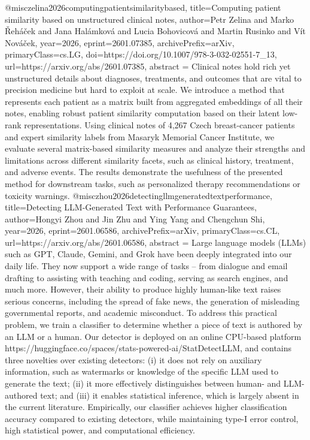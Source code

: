 {}@misc{zelina2026computingpatientsimilaritybased,
      title={Computing patient similarity based on unstructured clinical notes}, 
      author={Petr Zelina and Marko Řeháček and Jana Halámková and Lucia Bohovicová and Martin Rusinko and Vít Nováček},
      year={2026},
      eprint={2601.07385},
      archivePrefix={arXiv},
      primaryClass={cs.LG},
      doi={https://doi.org/10.1007/978-3-032-02551-7_13},
      url={https://arxiv.org/abs/2601.07385},
      abstract = {Clinical notes hold rich yet unstructured details about diagnoses, treatments, and outcomes that are vital to precision medicine but hard to exploit at scale. We introduce a method that represents each patient as a matrix built from aggregated embeddings of all their notes, enabling robust patient similarity computation based on their latent low-rank representations. Using clinical notes of 4,267 Czech breast-cancer patients and expert similarity labels from Masaryk Memorial Cancer Institute, we evaluate several matrix-based similarity measures and analyze their strengths and limitations across different similarity facets, such as clinical history, treatment, and adverse events. The results demonstrate the usefulness of the presented method for downstream tasks, such as personalized therapy recommendations or toxicity warnings.}
}@misc{zhou2026detectingllmgeneratedtextperformance,
      title={Detecting LLM-Generated Text with Performance Guarantees}, 
      author={Hongyi Zhou and Jin Zhu and Ying Yang and Chengchun Shi},
      year={2026},
      eprint={2601.06586},
      archivePrefix={arXiv},
      primaryClass={cs.CL},
      url={https://arxiv.org/abs/2601.06586},
      abstract = {Large language models (LLMs) such as GPT, Claude, Gemini, and Grok have been deeply integrated into our daily life. They now support a wide range of tasks -- from dialogue and email drafting to assisting with teaching and coding, serving as search engines, and much more. However, their ability to produce highly human-like text raises serious concerns, including the spread of fake news, the generation of misleading governmental reports, and academic misconduct. To address this practical problem, we train a classifier to determine whether a piece of text is authored by an LLM or a human. Our detector is deployed on an online CPU-based platform https://huggingface.co/spaces/stats-powered-ai/StatDetectLLM, and contains three novelties over existing detectors: (i) it does not rely on auxiliary information, such as watermarks or knowledge of the specific LLM used to generate the text; (ii) it more effectively distinguishes between human- and LLM-authored text; and (iii) it enables statistical inference, which is largely absent in the current literature. Empirically, our classifier achieves higher classification accuracy compared to existing detectors, while maintaining type-I error control, high statistical power, and computational efficiency.}
}
